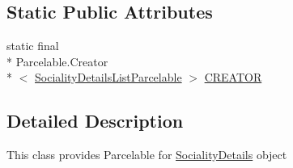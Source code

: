 \subsection*{Static Public Attributes}
\begin{DoxyCompactItemize}
\item 
static final \\*
Parcelable.\-Creator\\*
$<$ \hyperlink{classcs_1_1nsense_1_1inference_module_1_1_sociality_details_list_parcelable}{Sociality\-Details\-List\-Parcelable} $>$ \hyperlink{classcs_1_1nsense_1_1inference_module_1_1_sociality_details_list_parcelable_a1ac9aab4e11776bc7b7296fa1a3c21bd}{C\-R\-E\-A\-T\-O\-R}
\end{DoxyCompactItemize}


\subsection{Detailed Description}
This class provides Parcelable for \hyperlink{classcs_1_1nsense_1_1inference_module_1_1_sociality_details}{Sociality\-Details} object 

